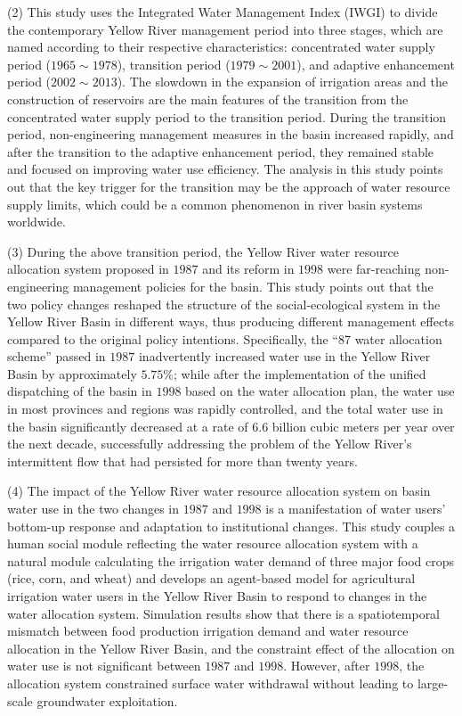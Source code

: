 \begin{eabstract}
  (2) This study uses the Integrated Water Management Index (IWGI) to divide the contemporary Yellow River management period into three stages, which are named according to their respective characteristics: concentrated water supply period ($1965 \sim 1978$), transition period ($1979 \sim 2001$), and adaptive enhancement period ($2002 \sim 2013$). The slowdown in the expansion of irrigation areas and the construction of reservoirs are the main features of the transition from the concentrated water supply period to the transition period. During the transition period, non-engineering management measures in the basin increased rapidly, and after the transition to the adaptive enhancement period, they remained stable and focused on improving water use efficiency. The analysis in this study points out that the key trigger for the transition may be the approach of water resource supply limits, which could be a common phenomenon in river basin systems worldwide.

  (3) During the above transition period, the Yellow River water resource allocation system proposed in $1987$ and its reform in $1998$ were far-reaching non-engineering management policies for the basin. This study points out that the two policy changes reshaped the structure of the social-ecological system in the Yellow River Basin in different ways, thus producing different management effects compared to the original policy intentions. Specifically, the ``87 water allocation scheme'' passed in $1987$ inadvertently increased water use in the Yellow River Basin by approximately $5.75\%$; while after the implementation of the unified dispatching of the basin in $1998$ based on the water allocation plan, the water use in most provinces and regions was rapidly controlled, and the total water use in the basin significantly decreased at a rate of $6.6$ billion cubic meters per year over the next decade, successfully addressing the problem of the Yellow River's intermittent flow that had persisted for more than twenty years.

  (4) The impact of the Yellow River water resource allocation system on basin water use in the two changes in $1987$ and $1998$ is a manifestation of water users' bottom-up response and adaptation to institutional changes. This study couples a human social module reflecting the water resource allocation system with a natural module calculating the irrigation water demand of three major food crops (rice, corn, and wheat) and develops an agent-based model for agricultural irrigation water users in the Yellow River Basin to respond to changes in the water allocation system. Simulation results show that there is a spatiotemporal mismatch between food production irrigation demand and water resource allocation in the Yellow River Basin, and the constraint effect of the allocation on water use is not significant between $1987$ and $1998$. However, after $1998$, the allocation system constrained surface water withdrawal without leading to large-scale groundwater exploitation.


\end{eabstract}
